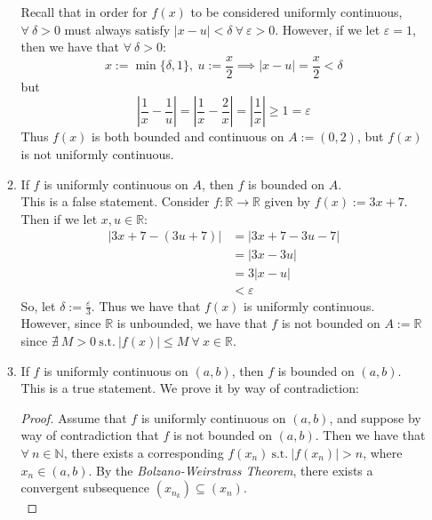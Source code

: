 \documentclass[12pt,letterpaper]{article}
\newcommand{\st}{\ \text{s.t.}\ }
\newcommand{\abs}[1]{\left\lvert #1 \right\rvert}
\newcommand{\R}{\mathbb{R}}
\newcommand{\N}{\mathbb{N}}
\theoremstyle{case}
\theoremstyle{definition}
\begin{document}
\begin{enumerate}
\begin{enumerate}
			Recall that in order for $f(x)$ to be considered uniformly continuous, $\forall\ \delta>0$ must always satisfy $|x-u|<\delta\ \forall\ \varepsilon > 0$. However, if we let $\varepsilon=1$, then we have that $\forall\ \delta>0$:
			\[x:=\min\{\delta, 1\},\ u:=\frac{x}{2} \implies |x-u|=\frac{x}{2}<\delta\]
			but
			\[\abs{\frac{1}{x}-\frac{1}{u}} = \abs{\frac{1}{x}-\frac{2}{x}}=\abs{\frac{1}{x}} \geq 1 = \varepsilon\]
			Thus $f(x)$ is both bounded and continuous on $A:=(0,2)$, but $f(x)$ is not uniformly continuous.\\
			\item If $f$ is uniformly continuous on $A$, then $f$ is bounded on $A$.\\
			
			This is a false statement. Consider $f:\R \to \R$ given by $f(x):=3x+7$. Then if we let $x,u \in \R$:
			\begin{align*}
				|3x+7-(3u+7)| &= |3x+7-3u-7| \\
				&=|3x-3u| \\
				&= 3|x-u| \\
				&< \varepsilon
			\end{align*}
			So, let $\delta := \frac{\varepsilon}{3}$. Thus we have that $f(x)$ is uniformly continuous. However, since $\R$ is unbounded, we have that $f$ is not bounded on $A:=\R$ since $\nexists\ M>0 \st |f(x)|\leq M\ \forall\ x \in \R$.\\
			\item If $f$ is uniformly continuous on $(a,b)$, then $f$ is bounded on $(a,b)$.\\
			
			This is a true statement. We prove it by way of contradiction:
			\begin{proof}
				Assume that $f$ is uniformly continuous on $(a,b)$, and suppose by way of contradiction that $f$ is not bounded on $(a,b)$. Then we have that $\forall\ n \in \N$, there exists a corresponding $f(x_n) \st |f(x_n)|>n$, where $x_n \in (a,b)$. By the \textit{Bolzano-Weirstrass Theorem}, there exists a convergent subsequence $(x_{n_k}) \subseteq (x_n)$.\\
				

\end{proof}
\end{enumerate}
\end{enumerate}
\end{document}
